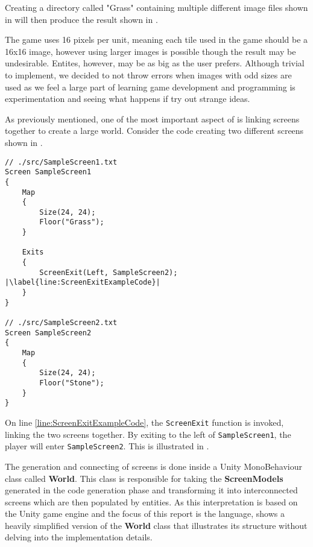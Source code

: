 Creating a directory called "Grass" containing multiple different image files shown in  will then produce the result shown in .



The game uses 16 pixels per unit, meaning each tile used in the game should be a 16x16 image, however using larger images is possible though the result may be undesirable. Entites, however, may be as big as the user prefers. 
Although trivial to implement, we decided to not throw errors when images with odd sizes are used as we feel a large part of learning game development and programming is experimentation and seeing what happens if try out strange ideas.


As previously mentioned, one of the most important aspect of \dazel{} is linking screens together to create a large world. Consider the code creating two different screens shown in .

\begin{lstlisting}[language=CSharp, caption={}, label={lst:DazelScreenExit},escapechar=|]
// ./src/SampleScreen1.txt
Screen SampleScreen1 
{
	Map 
	{
		Size(24, 24);
		Floor("Grass");
	}

	Exits
	{
		ScreenExit(Left, SampleScreen2); |\label{line:ScreenExitExampleCode}|
	}
}

// ./src/SampleScreen2.txt
Screen SampleScreen2
{
	Map 
	{
		Size(24, 24);
		Floor("Stone");
	}
}
\end{lstlisting}

On line \ref{line:ScreenExitExampleCode}, the \texttt{ScreenExit} function is invoked, linking the two screens together.
By exiting to the left of \texttt{SampleScreen1}, the player will enter \texttt{SampleScreen2}.
This is illustrated in .


The generation and connecting of screens is done inside a Unity MonoBehaviour class called \textbf{World}.
This class is responsible for taking the \textbf{ScreenModels} generated in the code generation phase and transforming it into interconnected screens which are then populated by entities. 
As this interpretation is based on the Unity game engine and the focus of this report is the \dazel{} language, 
 shows a heavily simplified version of the \textbf{World} class that illustrates its structure without delving into the implementation details.

